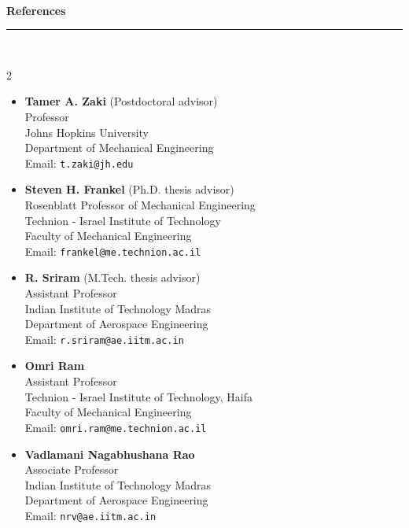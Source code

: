 
\ \\[2mm]
\noindent \textbf{\large{References}}\\[-2.5mm]
\noindent\rule{\textwidth}{0.4pt} \\[-2mm]
\begin{multicols}{2}
\noindent
\begin{itemize}[itemsep=2mm]
    \item \textbf{Tamer A. Zaki} (Postdoctoral advisor) \\
    Professor \\
    Johns Hopkins University \\
    Department of Mechanical Engineering \\
    Email: \texttt{t.zaki@jh.edu}

    \item \textbf{Steven H. Frankel} (Ph.D. thesis advisor) \\
    Rosenblatt Professor of Mechanical Engineering \\
    Technion - Israel Institute of Technology \\
    Faculty of Mechanical Engineering \\
    Email: \texttt{frankel@me.technion.ac.il}

    \item \textbf{R. Sriram} (M.Tech. thesis advisor) \\
    Assistant Professor \\
    Indian Institute of Technology Madras \\
    Department of Aerospace Engineering \\
    Email: \texttt{r.sriram@ae.iitm.ac.in}

    \item \textbf{Omri Ram} \\
    Assistant Professor \\
    Technion - Israel Institute of Technology, Haifa \\
    Faculty of Mechanical Engineering \\
    Email: \texttt{omri.ram@me.technion.ac.il}

    \item \textbf{Vadlamani Nagabhushana Rao} \\
    Associate Professor \\
    Indian Institute of Technology Madras \\
    Department of Aerospace Engineering \\
    Email: \texttt{nrv@ae.iitm.ac.in}
\end{itemize}
\end{multicols}


